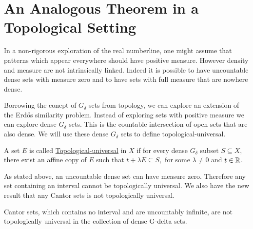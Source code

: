 \section{An Analogous Theorem in a Topological Setting}

In a non-rigorous exploration of the real numberline, one might assume that patterns which appear everywhere should have positive measure.  However density and measure are not intrinsically linked.  Indeed it is possible to have uncountable dense sets with measure zero and to have sets with full measure that are nowhere dense.  

Borrowing the conept of $G_\delta$ sets from topology, we can explore an extension of the Erd\H{o}s similarity problem.  Instead of exploring sets with positive measure we can explore dense $G_\delta$ sets.  This is the countable intersection of open sets that are also dense.  We will use these dense $G_\delta$ sets to define topological-universal. 

\begin{definition}
    A set $E$ is called \underline{Topological-universal} in $X$ if for every dense $G_\delta$ subset $S \subseteq X$, there exist an affine copy of $E$ such that $t+\lambda E \subseteq S,$ for some $\lambda \neq 0$ and $t \in \mathbb{R}$.  
\end{definition}

As stated above, an uncountable dense set can have measure zero.  Therefore any set containing an interval cannot be topologically universal.  We also have the new result that any Cantor sets is not topologically universal.  

Cantor sets, which contains no interval and are uncountably infinite, are not topologically universal in the collection of dense G-delta sets.  
